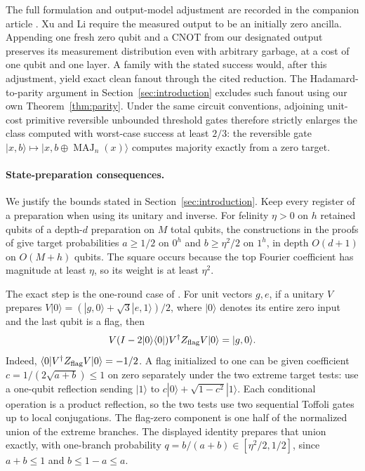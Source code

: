 The full formulation and output-model adjustment are recorded in the
companion article
\citep[Section~7.3, Corollary~10 and its proof]{OpenAILocalization2026}.
Xu and Li require the measured output to be an initially zero ancilla.
Appending one fresh zero qubit and a CNOT from our designated output
preserves its measurement distribution even with arbitrary garbage, at a
cost of one qubit and one layer.
A family with the stated success would, after this adjustment, yield exact
clean fanout through the cited reduction. The Hadamard-to-parity argument in
Section~\ref{sec:introduction} excludes such fanout using our own
Theorem~\ref{thm:parity}. Under the same circuit conventions, adjoining
unit-cost primitive reversible unbounded threshold gates therefore
strictly enlarges the class computed with worst-case success at least
\(2/3\): the reversible gate
\(\lvert x,b\rangle\mapsto\lvert x,b\mathbin\oplus\operatorname{MAJ}_n(x)\rangle\)
computes majority exactly from a zero target.

\paragraph{State-preparation consequences.}
We justify the bounds stated in Section~\ref{sec:introduction}.
Keep every register of a preparation when using its unitary and inverse.
For felinity $\eta>0$ on $h$ retained qubits of a depth-$d$ preparation
on $M$ total qubits, the constructions in the proofs of
\citet[Lemmas~4.9 and~4.1]{GGJ2026Fourier} give target probabilities
$a\ge1/2$ on $0^h$ and $b\ge\eta^2/2$ on $1^h$, in depth $O(d+1)$
on $O(M+h)$ qubits. The square occurs because the top Fourier
coefficient has magnitude at least $\eta$, so its weight is at least $\eta^2$.

The exact step is the one-round case of
\citet[Theorem~7]{GrierMorrisWu2026}. For unit vectors $g,e$, if a
unitary $V$ prepares
$V|0\rangle=(|g,0\rangle+\sqrt3|e,1\rangle)/2$, where $|0\rangle$
denotes its entire zero input and the last qubit is a flag, then
\[
 V(I-2|0\rangle\langle0|)V^\dagger Z_{\rm flag}V|0\rangle
 =|g,0\rangle.
\]
Indeed, $\langle0|V^\dagger Z_{\rm flag}V|0\rangle=-1/2$.
A flag initialized to one can be given coefficient
$c=1/(2\sqrt{a+b})\le1$ on zero separately under the two extreme
target tests: use a one-qubit reflection sending $|1\rangle$ to
$c|0\rangle+\sqrt{1-c^2}|1\rangle$. Each conditional operation is a
product reflection, so the two tests use two sequential Toffoli gates
up to local conjugations. The flag-zero component is one half of the
normalized union of the extreme branches. The displayed identity
prepares that union exactly, with one-branch probability
$q=b/(a+b)\in[\eta^2/2,1/2]$, since $a+b\le1$ and $b\le1-a\le a$.


